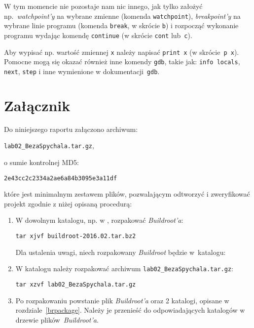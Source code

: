 \documentclass{article}
\newcommand{\labnumber}{2}
\begin{document}
W tym momencie nie pozostaje nam nic innego, jak tylko założyć np.~\emph{watchpoint'y} na wybrane zmienne (komenda \texttt{watchpoint}), \emph{breakpoint'y} na wybrane linie programu (komenda \texttt{break}, w skrócie \texttt{b}) i rozpocząć wykonanie programu wydając komendę \texttt{continue} (w skrócie \texttt{cont} lub~\texttt{c}).

Aby wypisać np. wartość zmiennej \texttt{x} należy napisać \texttt{print~x} (w skrócie~\texttt{p~x}). Pomocne mogą się okazać również inne komendy \texttt{gdb}, takie jak: \texttt{info locals}, \texttt{next}, \texttt{step} i inne wymienione w dokumentacji~\texttt{gdb}.


\section{Załącznik}

Do niniejszego raportu załączono archiwum:
\begin{center}
\texttt{lab0\labnumber\_BezaSpychala.tar.gz},
\end{center}
o sumie kontrolnej MD5:
\begin{center}
\texttt{2e43cc2c2334a2ae6a84b3095e3a11df}
\end{center}
które jest minimalnym zestawem plików, pozwalającym odtworzyć i zweryfikować projekt zgodnie z niżej opisaną procedurą:
\begin{enumerate}
\item W dowolnym katalogu, np. w , rozpakować \emph{Buildroot'a}:
\begin{center}
\texttt{tar xjvf buildroot-2016.02.tar.bz2}
\end{center}

Dla ustalenia uwagi, niech rozpakowany \emph{Buildroot} będzie w~katalogu:
\begin{center}
\end{center}

\item W katalogu  należy rozpakować archiwum \texttt{lab0\labnumber\_BezaSpychala.tar.gz}:
\begin{center}
\texttt{tar xzvf lab0\labnumber\_BezaSpychala.tar.gz}
\end{center}

\item Po rozpakowaniu powstanie plik  \emph{Buildroot'a} oraz 2 katalogi, opisane w rozdziale~\ref{brpackage}. Należy je przenieść do odpowiadających katalogów w drzewie plików~\emph{Buildroot'a}.
\end{enumerate}




\end{document}
